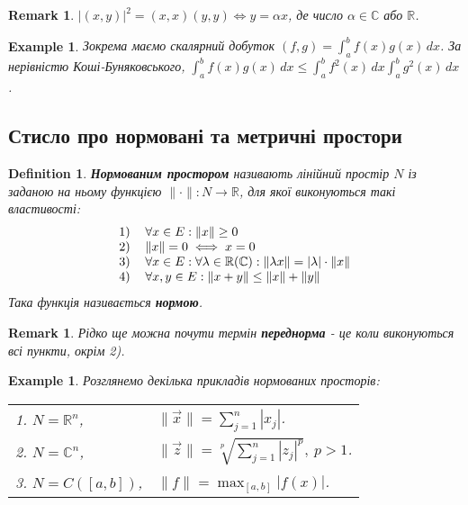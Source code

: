 \documentclass[a4paper, 10pt]{article}
\theoremstyle{theoremdd}
\newtheorem{definition}[theorem]{Definition}
\newtheorem{example}[theorem]{Example}
\newtheorem{remark}[theorem]{Remark}
\begin{document}
\begin{remark}
$|(x,y)|^2 = (x,x)(y,y) \iff y = \alpha x$, де число $\alpha \in \mathbb{C}$ або $\mathbb{R}$.
\end{remark}

\begin{example}
Зокрема маємо скалярний добуток $(f,g) = \displaystyle\int_a^b f(x)g(x)\,dx$. За нерівністю Коші-Буняковського, $\displaystyle\int_a^b f(x)g(x)\,dx \leq \int_a^b f^2(x)\,dx \int_a^b g^2(x)\,dx$.
\end{example}

\subsection{Стисло про нормовані та метричні простори}
\begin{definition}
\textbf{Нормованим простором} називають лінійний простір $N$ із заданою на ньому функцією $\|\cdot\| \colon N \to \mathbb{R}$, для якої виконуються такі властивості:
\begin{align*}
\begin{tabular}{cl}
1) & $\forall x \in E: \|x\| \geq 0$\\
2) & $\|x\| = 0 \iff x = 0$\\
3) & $\forall x \in E: \forall \lambda \in \mathbb{R} (\mathbb{C}): \|\lambda x\| = |\lambda| \cdot \|x\|$\\
4) & $\forall x,y \in E: \|x+y\| \leq \|x\|+\|y\|$
\end{tabular}
\end{align*}
Така функція називається \textbf{нормою}.
\end{definition}

\begin{remark}
Рідко ще можна почути термін \textbf{переднорма} - це коли виконуються всі пункти, окрім 2).
\end{remark}

\begin{example}
Розглянемо декілька прикладів нормованих просторів:\\
\begin{tabular}{ll}
1. $N = \mathbb{R}^n$, & $\|\vec{x}\| = \displaystyle \sum_{j=1}^n |x_j|$.\\
2. $N = \mathbb{C}^n$, & $\|\vec{z}\| = \displaystyle \sqrt[p]{\sum_{j=1}^n |z_j|^p},\ p>1$.\\
3. $N = C([a,b])$, & $\|f\| = \displaystyle \max_{[a,b]} |f(x)|$.
\end{tabular}
\end{example}
\end{document}

